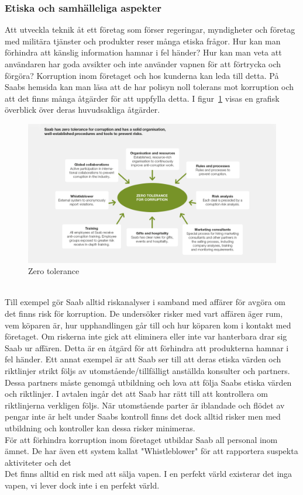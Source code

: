 \subsubsection{Etiska och samhälleliga aspekter}
Att utveckla teknik åt ett företag som förser regeringar, myndigheter och företag med militära tjänster och produkter reser många etiska frågor. Hur kan man förhindra att känslig information hamnar i fel händer? Hur kan man veta att användaren har goda avsikter och inte använder vapnen för att förtrycka och förgöra? Korruption inom företaget och hos kunderna kan leda till detta. På Saabs hemsida kan man läsa att de har polisyn noll tolerans mot korruption och att det finns många åtgärder för att uppfylla detta. I figur~\ref{fig:zerotolerance} visas en grafisk överblick över deras huvudsakliga åtgärder. 
\\
\leavevmode
\begin{figure}[h]
	\centering
	\includegraphics[scale=1.4]{grafik/modell_zero_corruption_1140x640.png}
	\caption{Zero tolerance}\label{fig:zerotolerance}	
\end{figure}  
\\
Till exempel gör Saab alltid riskanalyser i samband med affärer för avgöra om det finns risk för korruption. De undersöker risker med vart affären äger rum, vem köparen är, hur upphandlingen går till och hur köparen kom i kontakt med företaget. Om riskerna inte gick att eliminera eller inte var hanterbara drar sig Saab ur affären. Detta är en åtgärd för att förhindra att produkterna hamnar i fel händer. Ett annat exempel är att Saab ser till att deras etiska värden och riktlinjer strikt följs av utomstående/tillfälligt anställda konsulter och partners. Dessa partners måste genomgå utbildning och lova att följa Saabs etiska värden och riktlinjer. I avtalen ingår det att Saab har rätt till att kontrollera om riktlinjerna verkligen följs. När utomstående parter är iblandade och flödet av pengar inte är helt under Saabs kontroll finns det dock alltid risker men med utbildning och kontroller kan dessa risker minimeras.
\\ 
För att förhindra korruption inom företaget utbildar Saab all personal inom ämnet. De har även ett system kallat "Whistleblower" för att rapportera suspekta aktiviteter och det                  
\\
Det finns alltid en risk med att sälja vapen. I en perfekt värld existerar det inga vapen, vi lever dock inte i en perfekt värld.



